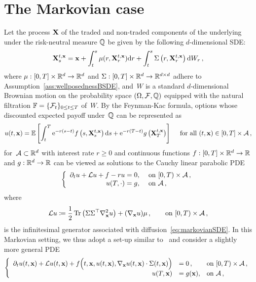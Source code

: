 \section{The Markovian case}\label{sec:markovian_case}
Let the process $\mathbf{X}$ of the traded and non-traded components of the underlying under the risk-neutral measure $\mathbb{Q}$ be given by the following $d$-dimensional SDE:
\begin{equation}\label{eq:markovianSDE}
\mathbf{X}_s^{t,\mathbf{x}} = \mathbf{x} + \int_t^s \mu(r, \mathbf{X}_r^{t,\mathbf{x}})\mathrm{d} r
+ \int_t^s \Sigma\left(r, \mathbf{X}_r^{t,\mathbf{x}}\right)\mathrm{d} W_r\,,
\end{equation}
where $\mu: [0, T]\times\mathbb{R}^d\rightarrow\mathbb{R}^d$
and $\Sigma:[0, T]\times\mathbb{R}^d\rightarrow\mathbb{R}^{d\times d}$ adhere to Assumption~\ref{ass:wellposednessBSDE}, 
and~$W$ is a standard $d$-dimensional Brownian motion on the probability space $(\Omega, \mathcal{F}, \mathbb{Q})$ equipped
with the natural filtration $\mathbb{F} = \{\mathcal{F}_t\}_{0\leq t\leq T}$ of~$W$. 
By the Feynman-Kac formula, options whose discounted expected payoff under~$\mathbb{Q}$ can be represented as
\begin{equation}
    u(t, \mathbf{x})=\mathbb{E}\left[\int_t^T \mathrm{e}^{-r(s-t)} f\left(s, \mathbf{X}_s^{t, \mathbf{x}}\right) \mathrm{d} s + \mathrm{e}^{-r(T-t)} g\left(\mathbf{X}_T^{t, \mathbf{x}}\right)\right]\quad \textup{ for all } (t, \mathbf{x}) \in[0, T] \times \mathcal{A}\,,
\end{equation}
for~$\mathcal{A}\subset\mathbb{R}^d$ with interest rate $r\geq 0$ and continuous functions $f:[0,T]\times\mathbb{R}^d\to\mathbb{R}$
and $g:\mathbb{R}^d\to\mathbb{R}$ can be viewed as solutions to the Cauchy linear parabolic PDE
\begin{equation*}
\left\{
\begin{array}{rl}
\partial_t u + \mathcal{L} u + f - ru= 0, & \text { on }[0, T) \times \mathcal{A}\,, \\
u(T, \cdot)= g, & \text { on } \mathcal{A}\,,
\end{array}
\right.
\end{equation*}
where
\begin{align}\label{eq:infinitesimal_generator}
\mathcal{L} u \coloneqq \frac{1}{2}\operatorname{Tr}
\left(\Sigma\Sigma^\top \nabla_{\mathbf{x}}^2 u\right) +  (\nabla_{\mathbf{x}} u)\mu\,,
\qquad\text{on }[0,T)\times \mathcal{A}\,,
\end{align}
is the infinitesimal generator associated with diffusion~\eqref{eq:markovianSDE}.
In this Markovian setting, we thus adopt a set-up similar to~\cite{Hure2020DeepPDEs} and consider a slightly more general PDE
\begin{equation}\label{eq:markovianPDE}
\left\{
\begin{array}{rll}
    \partial_t u(t,\mathbf{x}) + \mathcal{L} u(t,\mathbf{x}) + 
    f\Big(t, \mathbf{x}, u(t,\mathbf{x}), \nabla_{\mathbf{x}} u(t,\mathbf{x}) \cdot \Sigma(t,\mathbf{x})\Big) &= 0\,, & \text{on }[0, T) \times \mathcal{A}\,,\\
     u(T, \mathbf{x}) &= g(\mathbf{x}), & \text{on }\mathcal{A}\,,
\end{array}
\right.
\end{equation}
